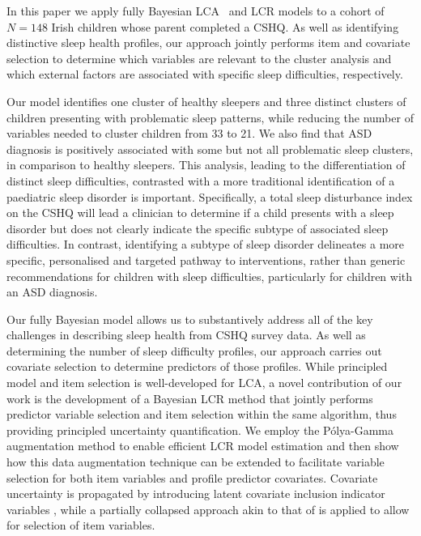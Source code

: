 \documentclass[11pt]{article}
\theoremstyle{plain}
\theoremstyle{definition}
\begin{document}
In this paper we apply fully Bayesian LCA~\citep{garrett_latent_2000,white_bayesian_2016} and LCR models to a cohort of $N=148$ Irish children whose parent completed a CSHQ. As well as identifying distinctive sleep health profiles, our approach jointly performs item and covariate selection to determine which variables are relevant to the cluster analysis and which external factors are associated with specific sleep difficulties, respectively. 

Our model identifies one cluster of healthy sleepers and three distinct clusters of children presenting with problematic sleep patterns, while reducing the number of variables needed to cluster children from 33 to 21. We also find that ASD diagnosis is positively associated with some but not all problematic sleep clusters, in comparison to healthy sleepers. This analysis, leading to the differentiation of distinct sleep difficulties, contrasted with a more traditional identification of a paediatric sleep disorder is important. Specifically, a total sleep disturbance index on the CSHQ will lead a clinician to determine if a child presents with a sleep disorder but does not clearly indicate the specific subtype of associated sleep difficulties. In contrast, identifying a subtype of sleep disorder delineates a more specific, personalised and targeted pathway to interventions, rather than generic recommendations for children with sleep difficulties, particularly for children with an ASD diagnosis.

Our fully Bayesian model allows us to substantively address all of the key challenges in describing sleep health from CSHQ survey data. As well as determining the number of sleep difficulty profiles, our approach carries out covariate selection to determine predictors of those profiles. While principled model and item selection is well-developed for LCA, a novel contribution of our work is the development of a Bayesian LCR method that jointly performs predictor variable selection and item selection within the same algorithm, thus providing principled uncertainty quantification. We employ the Pólya-Gamma augmentation method \citep{polson_bayesian_2013} to enable efficient LCR model estimation and then show how this data augmentation technique can be extended to facilitate variable selection for both item variables and profile predictor covariates.  Covariate uncertainty is propagated by introducing latent covariate inclusion indicator variables \citep{holmes_bayesian_2006}, while a partially collapsed approach akin to that of \citet{white_bayesian_2016} is applied to allow for selection of item variables.
\end{document}
